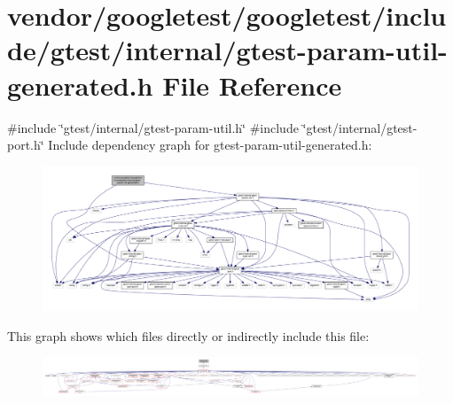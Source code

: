 \hypertarget{gtest-param-util-generated_8h}{}\section{vendor/googletest/googletest/include/gtest/internal/gtest-\/param-\/util-\/generated.h File Reference}
\label{gtest-param-util-generated_8h}
{\ttfamily \#include \char`\"{}gtest/internal/gtest-\/param-\/util.\+h\char`\"{}}\newline
{\ttfamily \#include \char`\"{}gtest/internal/gtest-\/port.\+h\char`\"{}}\newline
Include dependency graph for gtest-\/param-\/util-\/generated.h\+:
\nopagebreak
\begin{figure}[H]
\begin{center}
\leavevmode
\includegraphics[width=350pt]{gtest-param-util-generated_8h__incl}
\end{center}
\end{figure}
This graph shows which files directly or indirectly include this file\+:
\nopagebreak
\begin{figure}[H]
\begin{center}
\leavevmode
\includegraphics[width=350pt]{gtest-param-util-generated_8h__dep__incl}
\end{center}
\end{figure}
